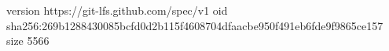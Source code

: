 version https://git-lfs.github.com/spec/v1
oid sha256:269b1288430085bcfd0d2b115f4608704dfaacbe950f491eb6fde9f9865ce157
size 5566
